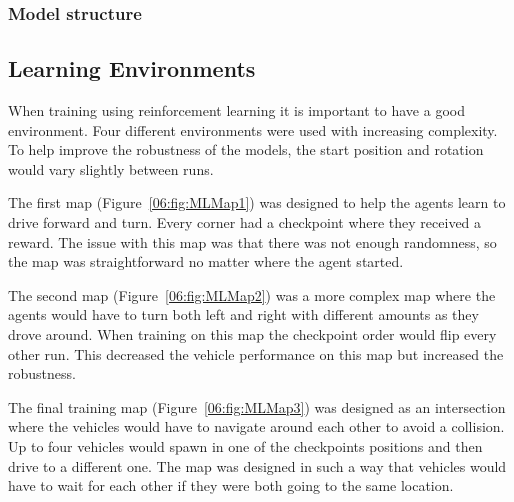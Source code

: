 \subsubsection{Model structure}






\subsection{Learning Environments}
When training using reinforcement learning it is important to have a good environment. Four different environments were used with increasing complexity. To help improve the robustness of the models, the start position and rotation would vary slightly between runs. 

The first map (Figure~\ref{06:fig:MLMap1}) was designed to help the agents learn to drive forward and turn. Every corner had a checkpoint where they received a reward. The issue with this map was that there was not enough randomness, so the map was straightforward no matter where the agent started. 

The second map (Figure~\ref{06:fig:MLMap2}) was a more complex map where the agents would have to turn both left and right with different amounts as they drove around. When training on this map the checkpoint order would flip every other run. This decreased the vehicle performance on this map but increased the robustness. 

The final training map (Figure~\ref{06:fig:MLMap3}) was designed as an intersection where the vehicles would have to navigate around each other to avoid a collision. Up to four vehicles would spawn in one of the checkpoints positions and then drive to a different one. The map was designed in such a way that vehicles would have to wait for each other if they were both going to the same location. 

